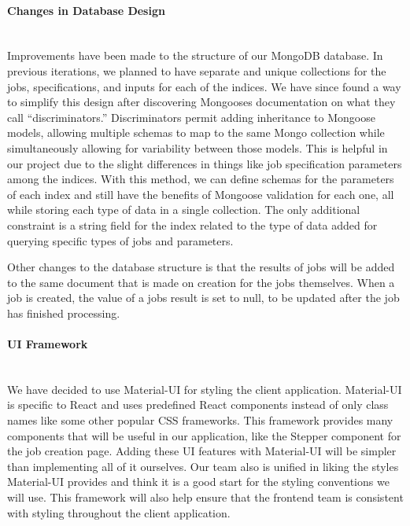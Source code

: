 \paragraph{Changes in Database Design} \mbox{}\\[\paragraphheaderspace]
Improvements have been made to the structure of our MongoDB database. In previous iterations, we planned to have separate and unique collections for the jobs, specifications, and inputs for each of the indices. We have since found a way to simplify this design after discovering Mongoose\textquotesingle s documentation on what they call ``discriminators.'' Discriminators permit adding inheritance to Mongoose models, allowing multiple schemas to map to the same Mongo collection while simultaneously allowing for variability between those models. This is helpful in our project due to the slight differences in things like job specification parameters among the indices. With this method, we can define schemas for the parameters of each index and still have the benefits of Mongoose validation for each one, all while storing each type of data in a single collection. The only additional constraint is a string field for the index related to the type of data added for querying specific types of jobs and parameters.\par
Other changes to the database structure is that the results of jobs will be added to the same document that is made on creation for the jobs themselves. When a job is created, the value of a job\textquotesingle s result is set to null, to be updated after the job has finished processing.\par

\paragraph{UI Framework} \mbox{}\\[\paragraphheaderspace]
We have decided to use Material-UI for styling the client application. Material-UI is specific to React and uses predefined React components instead of only class names like some other popular CSS frameworks. This framework provides many components that will be useful in our application, like the Stepper component for the job creation page. Adding these UI features with Material-UI will be simpler than implementing all of it ourselves. Our team also is unified in liking the styles Material-UI provides and think it is a good start for the styling conventions we will use. This framework will also help ensure that the frontend team is consistent with styling throughout the client application.\par

